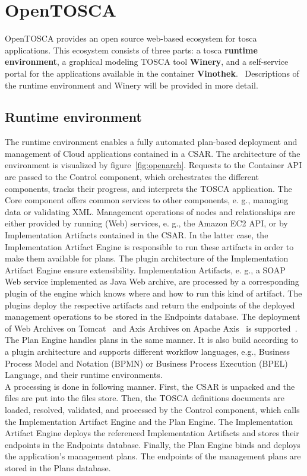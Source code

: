 \section{OpenTOSCA} \label{sec:opentosca}
OpenTOSCA provides an open source web-based ecosystem for \gls{tosca} applications. 
This ecosystem consists of three parts: a \gls{tosca} \textbf{runtime environment}, a graphical modeling TOSCA tool \textbf{Winery}, and a self-service portal for the applications available in the container \textbf{Vinothek}.~\cite*{OpenTOSCA}
Descriptions of the runtime environment and Winery will be provided in more detail. 

\subsection*{Runtime environment}
The runtime environment enables a fully automated plan-based deployment and management of Cloud applications contained in a CSAR. 
The architecture of the environment is visualized by figure~\ref{fig:openarch}.
Requests to the Container API are passed to the Control component, which orchestrates the different components, tracks their progress, and interprets the TOSCA application. 
The Core component offers common services to other components, e. g., managing data or validating XML.
Management operations of nodes and relationships are either provided by running (Web) services, e. g., the Amazon EC2 API, or by Implementation Artifacts contained in the CSAR.
In the latter case, the Implementation Artifact Engine is responsible to run these artifacts in order to make them available for plans. 
The plugin architecture of the Implementation Artifact Engine ensure extensibility.
Implementation Artifacts, e. g., a SOAP Web service implemented as Java Web archive, are processed by a corresponding plugin of the engine which knows where and how to run this kind of artifact. 
The plugins deploy the respective artifacts and return the endpoints of the deployed management operations to be stored in the Endpoints database.
The deployment of Web Archives on Tomcat~\cite*{tomcat} and Axis Archives on Apache Axis~\cite*{axis} is supported~\cite*{macharb}.
The Plan Engine handles plans in the same manner.
It is also build according to a plugin architecture and supports different workflow languages, e.g., Business Process Model and Notation (BPMN) or Business Process Execution (BPEL) Language, and their runtime environments.~\cite{INPROC-2013-45}
\\
A processing is done in following manner.  
First, the CSAR is unpacked and the files are put into the files store.
Then, the TOSCA definitions documents are loaded, resolved, validated, and processed by the Control component, which calls the Implementation Artifact Engine and the Plan Engine.
The Implementation Artifact Engine deploys the referenced Implementation Artifacts and stores their endpoints in the Endpoints database. 
Finally, the Plan Engine binds and deploys the application’s management plans.
The endpoints of the management plans are stored in the Plans database.~\cite{INPROC-2013-45}
%


